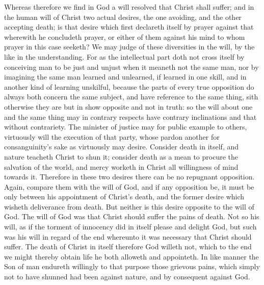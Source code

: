 Whereas therefore we find in God a will resolved that Christ shall suffer; and in the human will of Christ two actual desires, the one avoiding, and the other accepting death; is that desire which first declareth itself by prayer against that wherewith he concludeth prayer, or either of them against his mind to whom prayer in this case seeketh? We may judge of these diversities in the will, by the like in the understanding. For as the intellectual part doth not cross itself by conceiving man to be just and unjust when it meaneth not the same man, nor by imagining the same man learned and unlearned, if learned in one skill, and in another kind  of learning unskilful, because the parts of every true opposition do always both concern the same subject, and have reference to the same thing, sith otherwise they are but in show opposite and not in truth: so the will about one and the same thing may in contrary respects have contrary inclinations and that without contrariety. The minister of justice may for public example to others, virtuously will the execution of that party, whose pardon another for consanguinity’s sake as virtuously may desire. Consider death in itself, and nature teacheth Christ to shun it; consider death as a mean to procure the salvation of the world, and mercy worketh in Christ all willingness of mind towards it. Therefore in these two desires there can be no repugnant opposition. Again, compare them with the will of God, and if any opposition be, it must be only between his appointment of Christ’s death, and the former desire which wisheth deliverance from death. But neither is this desire opposite to the will of God. The will of God was that Christ should suffer the pains of death. Not so his will, as if the torment of innocency did in itself please and delight God, but such was his will in regard of the end whereunto it was necessary that Christ should suffer. The death of Christ in itself therefore God willeth not, which to the end we might thereby obtain life he both alloweth and appointeth. In like manner the Son of man endureth willingly to that purpose those grievous pains, which simply not to have shunned had been against nature, and by consequent against God.
